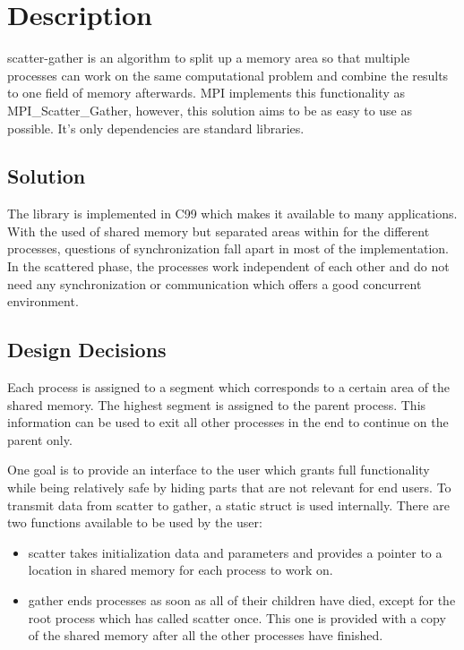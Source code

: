 \documentclass[a4paper]{article}
\begin{document}
\section{Description}

scatter-gather is an algorithm to split up a memory area so that multiple processes can work on the same computational problem and combine the results to one field of memory afterwards. MPI implements this functionality as MPI\_Scatter\_Gather, however, this solution aims to be as easy to use as possible. It's only dependencies are standard libraries.

\subsection{Solution}

The library is implemented in C99 which makes it available to many applications. With the used of shared memory but separated areas within for the different processes, questions of synchronization fall apart in most of the implementation. In the scattered phase, the processes work independent of each other and do not need any synchronization or communication which offers a good concurrent environment. 

\subsection{Design Decisions}

Each process is assigned to a segment which corresponds to a certain area of the shared memory. The highest segment is assigned to the parent process. This information can be used to exit all other processes in the end to continue on the parent only. 

One goal is to provide an interface to the user which grants full functionality while being relatively safe by hiding parts that are not relevant for end users. To transmit data from scatter to gather, a static struct is used internally. There are two functions available to be used by the user:

\begin{itemize}
    \item {scatter takes initialization data and parameters and provides a pointer to a location in shared memory for each process to work on. }
    \item {gather ends processes as soon as all of their children have died, except for the root process which has called scatter once. This one is provided with a copy of the shared memory after all the other processes have finished.}
\end{itemize}
\end{document}
